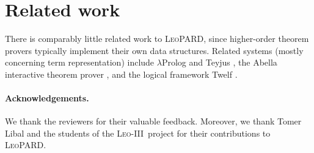 \documentclass{llncs}
\def\sys{\mbox{\textsc{LeoPARD}}}
\def\leoc{\mbox{\textsc{Leo-III}}}
\begin{document}
\section{Related work}
There is comparably little related work to \sys, since higher-order theorem provers typically implement
their own data structures. Related systems  (mostly concerning term representation) include $\lambda$Prolog and Teyjus \cite{teyjus},
the Abella interactive theorem prover \cite{abella}, and the logical framework Twelf \cite{twelf}.



\paragraph{Acknowledgements.}
We thank the reviewers for their valuable feedback. Moreover, we thank Tomer Libal and the students of the \leoc~project
for their contributions to \sys.


%
\end{document}
